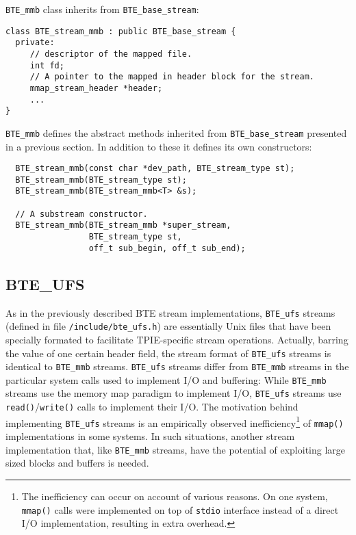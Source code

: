 \verb|BTE_mmb| class inherits from \verb|BTE_base_stream|:
\begin{verbatim}
class BTE_stream_mmb : public BTE_base_stream {
  private:
     // descriptor of the mapped file.  
     int fd;   
     // A pointer to the mapped in header block for the stream. 
     mmap_stream_header *header;
     ...
}  
\end{verbatim}

\verb|BTE_mmb| defines the abstract methods inherited from
\verb|BTE_base_stream| presented in a previous section. In addition to these it defines its own
constructors:
\begin{verbatim}
  BTE_stream_mmb(const char *dev_path, BTE_stream_type st); 
  BTE_stream_mmb(BTE_stream_type st); 
  BTE_stream_mmb(BTE_stream_mmb<T> &s); 
  
  // A substream constructor.
  BTE_stream_mmb(BTE_stream_mmb *super_stream,
                 BTE_stream_type st,
                 off_t sub_begin, off_t sub_end);
\end{verbatim}


\subsection{BTE\_UFS}

\tobeextended

As in the previously described BTE stream implementations, \verb|BTE_ufs|
streams (defined in file \verb|/include/bte_ufs.h|) are essentially Unix
files that have been specially formated to facilitate TPIE-specific stream
operations. Actually, barring the value of one certain header field, the
stream format of \verb|BTE_ufs| streams is identical to \verb|BTE_mmb|
streams. \verb|BTE_ufs| streams differ from \verb|BTE_mmb| streams in the
particular system calls used to implement I/O and buffering: While
\verb|BTE_mmb| streams use the memory map paradigm to implement I/O,
\verb|BTE_ufs| streams use \verb|read()|/\verb|write()| calls to implement
their I/O. The motivation behind implementing \verb|BTE_ufs| streams is an
empirically observed inefficiency\footnote{The inefficiency can occur on
account of various reasons. On one system, \verb|mmap()| calls were
implemented on top of \verb|stdio| interface instead of a direct I/O
implementation, resulting in extra overhead.} of \verb|mmap()|
implementations in some systems. In such
situations, another stream implementation that, like \verb|BTE_mmb|
streams, have the potential of exploiting large sized blocks and buffers is
needed.

